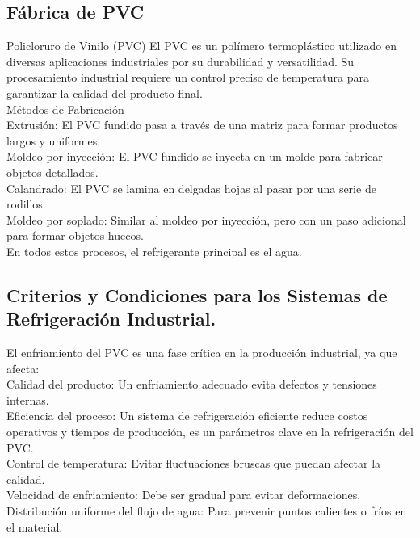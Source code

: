   \subsection{Fábrica de PVC}
  Policloruro de Vinilo (PVC)
  El PVC es un polímero termoplástico utilizado en diversas aplicaciones industriales por su durabilidad y versatilidad. Su procesamiento industrial requiere un control preciso de temperatura para garantizar la calidad del producto final. \cite{Luis}\\
  Métodos de Fabricación\\
  Extrusión: El PVC fundido pasa a través de una matriz para formar productos largos y uniformes.\\
  Moldeo por inyección: El PVC fundido se inyecta en un molde para fabricar objetos detallados.\\
  Calandrado: El PVC se lamina en delgadas hojas al pasar por una serie de rodillos.\\
  Moldeo por soplado: Similar al moldeo por inyección, pero con un paso adicional para formar objetos huecos.\\
  En todos estos procesos, el refrigerante principal es el agua.\\

  \subsection{Criterios y Condiciones para los Sistemas de Refrigeración Industrial.}
  El enfriamiento del PVC es una fase crítica en la producción industrial, ya que afecta:\\
  Calidad del producto: Un enfriamiento adecuado evita defectos y tensiones internas.\\
  Eficiencia del proceso: Un sistema de refrigeración eficiente reduce costos operativos y tiempos de producción, es un
  parámetros clave en la refrigeración del PVC.\\
  Control de temperatura: Evitar fluctuaciones bruscas que puedan afectar la calidad.\\
  Velocidad de enfriamiento: Debe ser gradual para evitar deformaciones.\\
  Distribución uniforme del flujo de agua: Para prevenir puntos calientes o fríos en el material.\\

